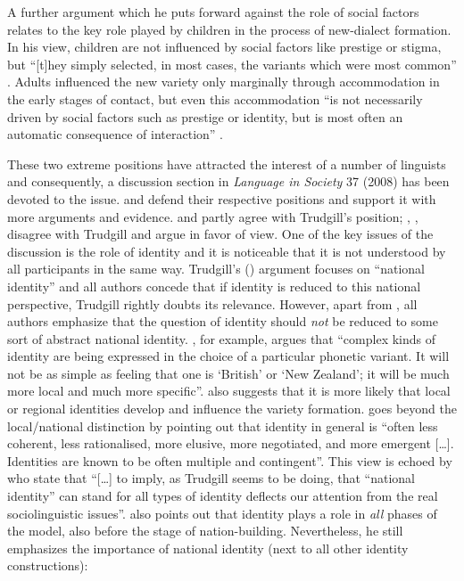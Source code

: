 A further argument which he puts forward against the role of social factors relates to the key role played by children in the process of new-dialect formation. In his view, children are not influenced by social factors like prestige or stigma, but “[t]hey simply selected, in most cases, the variants which were most common” \citep[115]{Trudgill2004}. Adults influenced the new variety only marginally through accommodation in the early stages of contact, but even this accommodation “is not necessarily driven by social factors such as prestige or identity, but is most often an automatic consequence of interaction” \citep[28]{Trudgill2004}.

These two extreme positions have attracted the interest of a number of linguists and consequently, a discussion section in \emph{Language in Society} 37 (2008) has been devoted to the issue. \citet{Schneider2008b} and \citet{Trudgill2008b, Trudgill2008c} defend their respective positions and support it with more arguments and evidence. \citet{Mufwene2008} and \citet{Tuten2008} partly agree with Trudgill’s position; \citet{Bauer2008}, \citet{Coupland2008}, \citet{Holmes2008} disagree with Trudgill and argue in favor of  view. One of the key issues of the discussion is the role of identity and it is noticeable that it is not understood by all participants in the same way. Trudgill’s (\citeyear{Trudgill2004, Trudgill2008}) argument focuses on “national identity” and all authors concede that if identity is reduced to this national perspective, Trudgill rightly doubts its relevance. However, apart from \citet{Mufwene2008}, all authors emphasize that the question of identity should \emph{not} be reduced to some sort of abstract national identity. \citet[273]{Bauer2008}, for example, argues that “complex kinds of identity are being expressed in the choice of a particular phonetic variant. It will not be as simple as feeling that one is ‘British’ or ‘New Zealand’; it will be much more local and much more specific”. \citet[259]{Tuten2008} also suggests that it is more likely that local or regional identities develop and influence the variety formation. \citet[269]{Coupland2008} goes beyond the local/national distinction by pointing out that identity in general is “often less coherent, less rationalised, more elusive, more negotiated, and more emergent […]. Identities are known to be often multiple and contingent”. This view is echoed by \citet[274]{Holmes2008} who state that “[…] to imply, as Trudgill seems to be doing, that “national identity” can stand for all types of identity deflects our attention from the real sociolinguistic issues”. \citet[265]{Schneider2008b} also points out that identity plays a role in \emph{all} phases of the model, also before the stage of nation-building. Nevertheless, he still emphasizes the importance of national identity (next to all other identity constructions):

